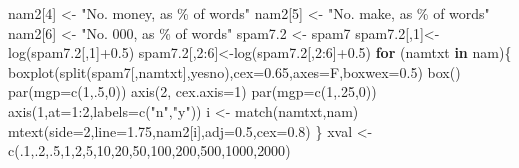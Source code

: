\documentclass[
  10pt,
  b5paper]{book}
\newenvironment{Shaded}{\begin{snugshade}}{\end{snugshade}}
\newcommand{\AttributeTok}[1]{\textcolor[rgb]{0.77,0.63,0.00}{#1}}
\newcommand{\ControlFlowTok}[1]{\textcolor[rgb]{0.13,0.29,0.53}{\textbf{#1}}}
\newcommand{\DecValTok}[1]{\textcolor[rgb]{0.00,0.00,0.81}{#1}}
\newcommand{\FloatTok}[1]{\textcolor[rgb]{0.00,0.00,0.81}{#1}}
\newcommand{\FunctionTok}[1]{\textcolor[rgb]{0.00,0.00,0.00}{#1}}
\newcommand{\NormalTok}[1]{#1}
\newcommand{\OtherTok}[1]{\textcolor[rgb]{0.56,0.35,0.01}{#1}}
\newcommand{\SpecialCharTok}[1]{\textcolor[rgb]{0.00,0.00,0.00}{#1}}
\newcommand{\StringTok}[1]{\textcolor[rgb]{0.31,0.60,0.02}{#1}}
\begin{document}
\begin{Shaded}
\begin{Highlighting}[]
\NormalTok{  nam2[}\DecValTok{4}\NormalTok{] }\OtherTok{\textless{}{-}} \StringTok{"No. \textquotesingle{}money\textquotesingle{}, as \% of words"}  
\NormalTok{  nam2[}\DecValTok{5}\NormalTok{] }\OtherTok{\textless{}{-}} \StringTok{"No. \textquotesingle{}make\textquotesingle{}, as \% of words"}
\NormalTok{  nam2[}\DecValTok{6}\NormalTok{] }\OtherTok{\textless{}{-}} \StringTok{"No. \textquotesingle{}000\textquotesingle{}, as \% of words"}
\NormalTok{  spam7}\FloatTok{.2} \OtherTok{\textless{}{-}}\NormalTok{ spam7}
\NormalTok{  spam7}\FloatTok{.2}\NormalTok{[,}\DecValTok{1}\NormalTok{]}\OtherTok{\textless{}{-}}\FunctionTok{log}\NormalTok{(spam7}\FloatTok{.2}\NormalTok{[,}\DecValTok{1}\NormalTok{]}\SpecialCharTok{+}\FloatTok{0.5}\NormalTok{)}
\NormalTok{  spam7}\FloatTok{.2}\NormalTok{[,}\DecValTok{2}\SpecialCharTok{:}\DecValTok{6}\NormalTok{]}\OtherTok{\textless{}{-}}\FunctionTok{log}\NormalTok{(spam7}\FloatTok{.2}\NormalTok{[,}\DecValTok{2}\SpecialCharTok{:}\DecValTok{6}\NormalTok{]}\SpecialCharTok{+}\FloatTok{0.5}\NormalTok{)}
  \ControlFlowTok{for}\NormalTok{ (namtxt }\ControlFlowTok{in}\NormalTok{ nam)\{}
    \FunctionTok{boxplot}\NormalTok{(}\FunctionTok{split}\NormalTok{(spam7[,namtxt],yesno),}\AttributeTok{cex=}\FloatTok{0.65}\NormalTok{,}\AttributeTok{axes=}\NormalTok{F,}\AttributeTok{boxwex=}\FloatTok{0.5}\NormalTok{)}
    \FunctionTok{box}\NormalTok{()}
    \FunctionTok{par}\NormalTok{(}\AttributeTok{mgp=}\FunctionTok{c}\NormalTok{(}\DecValTok{1}\NormalTok{,.}\DecValTok{5}\NormalTok{,}\DecValTok{0}\NormalTok{))}
    \FunctionTok{axis}\NormalTok{(}\DecValTok{2}\NormalTok{, }\AttributeTok{cex.axis=}\DecValTok{1}\NormalTok{)}
    \FunctionTok{par}\NormalTok{(}\AttributeTok{mgp=}\FunctionTok{c}\NormalTok{(}\DecValTok{1}\NormalTok{,.}\DecValTok{25}\NormalTok{,}\DecValTok{0}\NormalTok{))}
    \FunctionTok{axis}\NormalTok{(}\DecValTok{1}\NormalTok{,}\AttributeTok{at=}\DecValTok{1}\SpecialCharTok{:}\DecValTok{2}\NormalTok{,}\AttributeTok{labels=}\FunctionTok{c}\NormalTok{(}\StringTok{"n"}\NormalTok{,}\StringTok{"y"}\NormalTok{))}
\NormalTok{    i }\OtherTok{\textless{}{-}} \FunctionTok{match}\NormalTok{(namtxt,nam)}
    \FunctionTok{mtext}\NormalTok{(}\AttributeTok{side=}\DecValTok{2}\NormalTok{,}\AttributeTok{line=}\FloatTok{1.75}\NormalTok{,nam2[i],}\AttributeTok{adj=}\FloatTok{0.5}\NormalTok{,}\AttributeTok{cex=}\FloatTok{0.8}\NormalTok{)}
\NormalTok{  \}}
\NormalTok{  xval }\OtherTok{\textless{}{-}}\FunctionTok{c}\NormalTok{(.}\DecValTok{1}\NormalTok{,.}\DecValTok{2}\NormalTok{,.}\DecValTok{5}\NormalTok{,}\DecValTok{1}\NormalTok{,}\DecValTok{2}\NormalTok{,}\DecValTok{5}\NormalTok{,}\DecValTok{10}\NormalTok{,}\DecValTok{20}\NormalTok{,}\DecValTok{50}\NormalTok{,}\DecValTok{100}\NormalTok{,}\DecValTok{200}\NormalTok{,}\DecValTok{500}\NormalTok{,}\DecValTok{1000}\NormalTok{,}\DecValTok{2000}\NormalTok{)}

\end{Highlighting}
\end{Shaded}
\end{document}
